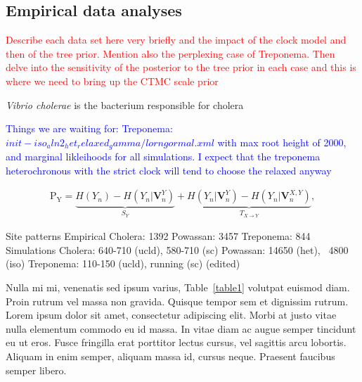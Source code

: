 \documentclass[10pt,letterpaper]{article}
\begin{document}
\subsection*{Empirical data analyses}

\textcolor{red}{Describe each data set here very briefly and the impact of the clock model and then of the tree prior. Mention also the perplexing case of Treponema. Then delve into the sensitivity of the posterior to the tree prior in each case and this is where we need to bring up the CTMC scale prior}

\textit{Vibrio cholerae} is the bacterium responsible for cholera 

\textcolor{blue}{Things we are waiting for: Treponema: $init-iso_aln2_het_relaxed_gamma/lorngormal.xml$ with max root height of 2000, and marginal likleihoods for all simulations. I expect that the treponema heterochronous with the strict clock will tend to choose the relaxed anyway}

\begin{eqnarray}
\label{eq:schemeP}
	\mathrm{P_Y} = \underbrace{H(Y_n) - H(Y_n|\mathbf{V}^{Y}_{n})}_{S_Y} + \underbrace{H(Y_n|\mathbf{V}^{Y}_{n})- H(Y_n|\mathbf{V}^{X,Y}_{n})}_{T_{X\rightarrow Y}},
\end{eqnarray}




Site patterns
Empirical
Cholera: 1392
Powassan: 3457
Treponema: 844
Simulations
Cholera: 640-710 (ucld), 580-710 (sc)
Powassan: 14650 (het), ~4800 (iso)
Treponema: 110-150 (ucld), running (sc) (edited)

Nulla mi mi, venenatis sed ipsum varius, Table~\ref{table1} volutpat euismod diam. Proin rutrum vel massa non gravida. Quisque tempor sem et dignissim rutrum. Lorem ipsum dolor sit amet, consectetur adipiscing elit. Morbi at justo vitae nulla elementum commodo eu id massa. In vitae diam ac augue semper tincidunt eu ut eros. Fusce fringilla erat porttitor lectus cursus, vel sagittis arcu lobortis. Aliquam in enim semper, aliquam massa id, cursus neque. Praesent faucibus semper libero.
\end{document}
